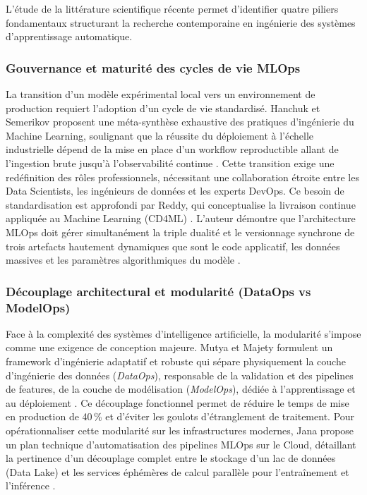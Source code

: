 L'étude de la littérature scientifique récente permet d'identifier quatre piliers fondamentaux structurant la recherche contemporaine en ingénierie des systèmes d'apprentissage automatique.

\subsubsection{Gouvernance et maturité des cycles de vie MLOps}
La transition d'un modèle expérimental local vers un environnement de production requiert l'adoption d'un cycle de vie standardisé. Hanchuk et Semerikov proposent une méta-synthèse exhaustive des pratiques d'ingénierie du Machine Learning, soulignant que la réussite du déploiement à l'échelle industrielle dépend de la mise en place d'un workflow reproductible allant de l'ingestion brute jusqu'à l'observabilité continue \cite{88}. Cette transition exige une redéfinition des rôles professionnels, nécessitant une collaboration étroite entre les Data Scientists, les ingénieurs de données et les experts DevOps. Ce besoin de standardisation est approfondi par Reddy, qui conceptualise la livraison continue appliquée au Machine Learning (CD4ML) \cite{90}. L'auteur démontre que l'architecture MLOps doit gérer simultanément la triple dualité et le versionnage synchrone de trois artefacts hautement dynamiques que sont le code applicatif, les données massives et les paramètres algorithmiques du modèle \cite{90}.

\subsubsection{Découplage architectural et modularité (DataOps vs ModelOps)}
Face à la complexité des systèmes d'intelligence artificielle, la modularité s'impose comme une exigence de conception majeure. Mutya et Majety formulent un framework d'ingénierie adaptatif et robuste qui sépare physiquement la couche d'ingénierie des données (\textit{DataOps}), responsable de la validation et des pipelines de features, de la couche de modélisation (\textit{ModelOps}), dédiée à l'apprentissage et au déploiement \cite{89}. Ce découplage fonctionnel permet de réduire le temps de mise en production de 40\,\% et d'éviter les goulots d'étranglement de traitement. Pour opérationnaliser cette modularité sur les infrastructures modernes, Jana propose un plan technique d'automatisation des pipelines MLOps sur le Cloud, détaillant la pertinence d'un découplage complet entre le stockage d'un lac de données (Data Lake) et les services éphémères de calcul parallèle pour l'entraînement et l'inférence \cite{94}.


